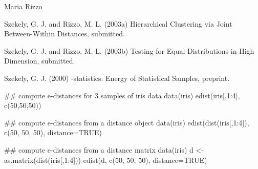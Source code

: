 \begin{Author}\relax
Maria Rizzo 
\end{Author}
\begin{References}\relax
Szekely, G. J. and Rizzo, M. L. (2003a) Hierarchical Clustering
via Joint Between-Within Distances, submitted.

Szekely, G. J. and Rizzo, M. L. (2003b) Testing for Equal
Distributions in High Dimension, submitted.

Szekely, G. J. (2000) -statistics: Energy of 
Statistical Samples, preprint.\end{References}
\begin{SeeAlso}\relax
{}
 
\end{SeeAlso}
\begin{Examples}
\begin{ExampleCode}
 ## compute e-distances for 3 samples of iris data
 data(iris)
 edist(iris[,1:4], c(50,50,50))

 ## compute e-distances from a distance object
 data(iris)
 edist(dist(iris[,1:4]), c(50, 50, 50), distance=TRUE)

 ## compute e-distances from a distance matrix
 data(iris)
 d <- as.matrix(dist(iris[,1:4]))
 edist(d, c(50, 50, 50), distance=TRUE) 
\end{ExampleCode}
\end{Examples}


